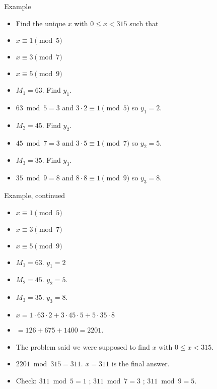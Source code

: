 \documentclass{beamer}
\begin{document}
\begin{frame}{Example}

\begin{itemize}
  \item Find the unique $x$ with $0\leq x < 315$ such that
  \item $x \equiv 1 \pmod 5$
  \item $x \equiv 3 \pmod 7$
  \item $x \equiv 5 \pmod 9$
  \item $M_1 = 63$. Find $y_1$.
  \item $63 \bmod 5 = 3$ and $3\cdot 2 \equiv 1 \pmod 5$ so $y_1 = 2$.
  \item $M_2 = 45$. Find $y_2$.
  \item $45 \bmod 7 = 3$ and  $3 \cdot 5 \equiv 1 \pmod 7$ so  $y_2 = 5$.
  \item $M_3 = 35$. Find $y_3$.
  \item $35 \bmod 9 = 8$ and $8 \cdot 8 \equiv 1 \pmod 9$ so $y_3 = 8$.
\end{itemize}

\end{frame}

\begin{frame}{Example, continued}

\begin{itemize}
  \item $x \equiv 1 \pmod 5$
  \item $x \equiv 3 \pmod 7$
  \item $x \equiv 5 \pmod 9$
  \item $M_1 = 63$. $y_1 = 2$
  \item $M_2 = 45$. $y_2 = 5$.
  \item $M_3 = 35$. $y_3 = 8$.
  \item $x = 1 \cdot 63 \cdot 2 + 3 \cdot 45 \cdot 5 + 5 \cdot 35 \cdot 8 $
  \item $= 126 + 675 + 1400 = 2201$.
  \item The problem said we were supposed to find $x$ with $0\leq x < 315$.
  \item $2201\bmod 315 = 311$. $x=311$ is the final answer.
  \item Check: $311 \bmod 5 = 1$ ; $311 \bmod 7 = 3$ ; $311 \bmod 9 = 5$.
\end{itemize}

\end{frame}
\end{document}

